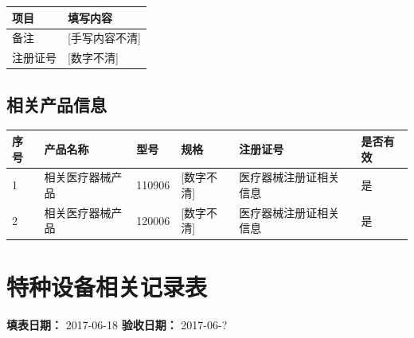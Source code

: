 \documentclass[UTF8,10pt,a4paper,fontset=fandol]{ctexart}
\newcommand{\fieldvalue}[1]{#1}
\newcommand{\handwritten}[1]{#1}
\begin{document}
\begin{tabularx}{\textwidth}{|p{}|X|}
\hline
项目 & 填写内容 \\
\hline
备注 &
\fieldvalue{\handwritten{[手写内容不清]}} \\
\hline
注册证号 &
\fieldvalue{\handwritten{[数字不清]}} \\
\hline
\end{tabularx}

\subsection*{相关产品信息}

\begin{tabularx}{\textwidth}{|p{}|X|p{}|p{}|p{}|p{}|}
\hline
序号 & 产品名称 & 型号 & 规格 & 注册证号 & 是否有效 \\
\hline
1 &
相关医疗器械产品 &
\fieldvalue{\handwritten{110906}} &
\fieldvalue{\handwritten{[数字不清]}} &
医疗器械注册证相关信息 &
是 \\
\hline
2 &
相关医疗器械产品 &
\fieldvalue{\handwritten{120006}} &
\fieldvalue{\handwritten{[数字不清]}} &
医疗器械注册证相关信息 &
是 \\
\hline
\end{tabularx}


\newpage


\section*{特种设备相关记录表}

\noindent
\textbf{填表日期：}
\fieldvalue{\handwritten{2017-06-18}}
\hfill
\textbf{验收日期：}
\fieldvalue{\handwritten{2017-06-?}}
\end{document}
